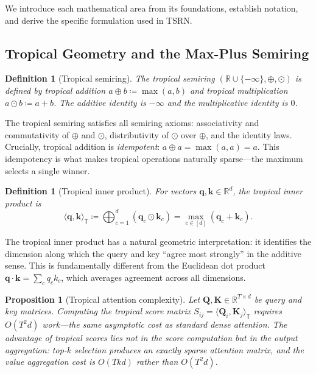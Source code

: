 \documentclass[11pt,a4paper]{article}
\newtheorem{proposition}[theorem]{Proposition}
\newtheorem{definition}[theorem]{Definition}
\newcommand{\R}{\mathbb{R}}
\newcommand{\Trop}{\mathbb{T}}
\newcommand{\ip}[2]{\langle #1, #2 \rangle}
\begin{document}
We introduce each mathematical area from its foundations, establish
notation, and derive the specific formulation used in TSRN.

\subsection{Tropical Geometry and the Max-Plus Semiring}
\label{sec:tropical}

\begin{definition}[Tropical semiring]
The \emph{tropical semiring} $(\R \cup \{-\infty\}, \oplus, \odot)$ is
defined by tropical addition $a \oplus b \coloneqq \max(a, b)$ and
tropical multiplication $a \odot b \coloneqq a + b$.  The additive
identity is $-\infty$ and the multiplicative identity is $0$.
\end{definition}

The tropical semiring satisfies all semiring axioms: associativity and
commutativity of $\oplus$ and $\odot$, distributivity of $\odot$ over
$\oplus$, and the identity laws.  Crucially, tropical addition is
\emph{idempotent}: $a \oplus a = \max(a, a) = a$.  This idempotency
is what makes tropical operations naturally sparse---the maximum
selects a single winner.

\begin{definition}[Tropical inner product]
For vectors $\bm{q}, \bm{k} \in \R^d$, the tropical inner product is
\begin{equation}
\ip{\bm{q}}{\bm{k}}_{\Trop} \coloneqq
  \bigoplus_{c=1}^{d} (\bm{q}_c \odot \bm{k}_c)
  = \max_{c \in [d]} (\bm{q}_c + \bm{k}_c).
\label{eq:trop_ip}
\end{equation}
\end{definition}

The tropical inner product has a natural geometric interpretation:
it identifies the dimension along which the query and key ``agree most
strongly'' in the additive sense.  This is fundamentally different from
the Euclidean dot product $\bm{q} \cdot \bm{k} = \sum_c q_c k_c$,
which averages agreement across all dimensions.

\begin{proposition}[Tropical attention complexity]
\label{prop:complexity}
Let $\bm{Q}, \bm{K} \in \R^{T \times d}$ be query and key matrices.
Computing the tropical score matrix
$S_{ij} = \ip{\bm{Q}_i}{\bm{K}_j}_{\Trop}$ requires $O(T^2 d)$
work---the same asymptotic cost as standard dense attention.
The advantage of tropical scores lies not in the score computation
but in the \emph{output aggregation}: top-$k$ selection produces
an exactly sparse attention matrix, and the value aggregation
cost is $O(Tkd)$ rather than $O(T^2 d)$.
\end{proposition}
\end{document}
